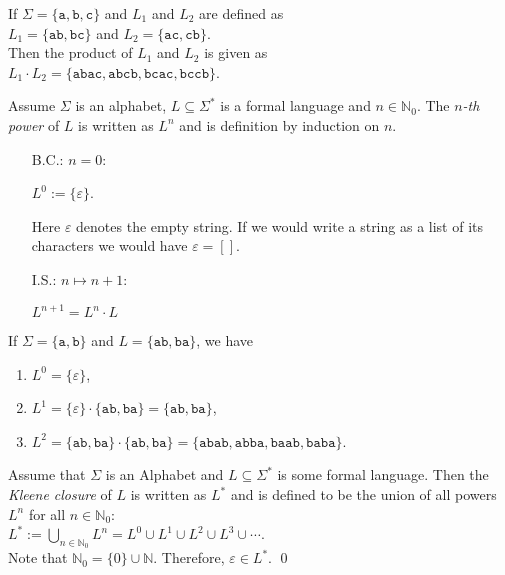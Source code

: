 \exampleEng
If $\Sigma = \{ \texttt{a}, \texttt{b}, \texttt{c} \}$ and $L_1$ and $L_2$ are defined as
\\[0.2cm]
\hspace*{1.3cm}
$L_1 = \{ \texttt{ab}, \texttt{bc} \}$ \quad and \quad
$L_2 = \{ \texttt{ac}, \texttt{cb} \}$. 
\\[0.2cm]
Then the product of $L_1$ and $L_2$ is given as
\\[0.2cm]
\hspace*{1.3cm}
$L_1 \cdot L_2 = \{ \texttt{abac}, \texttt{abcb}, \texttt{bcac}, \texttt{bccb} \}$.  \eox

\begin{Definition} 
Assume $\Sigma$ is an  alphabet, $L \subseteq \Sigma^*$ is a formal language and $n\in\mathbb{N}_0$.
The  \emph{$n$-th power} of $L$ is written as  $L^n$ and is definition by induction on  $n$. 
\begin{enumerate}
\item[B.C.:] $n = 0$: 

      $L^0 := \{ \varepsilon \}$.

      Here $\varepsilon$ denotes the empty string.  If we would write a string as a list of its characters we would have
      $\varepsilon = []$.
\item[I.S.:] $n \mapsto n + 1$:

      $L^{n+1} = L^n \cdot L$  \eox
\end{enumerate}
\end{Definition}

\exampleEng
If $\Sigma = \{ \texttt{a}, \texttt{b} \}$ and $L = \{ \texttt{ab}, \texttt{ba} \}$, we have
\begin{enumerate}
\item $L^0 = \{ \varepsilon \}$,
\item $L^1 = \{ \varepsilon \} \cdot \{ \texttt{ab}, \texttt{ba} \} = \{ \texttt{ab}, \texttt{ba} \}$,
\item $L^2 = \{ \texttt{ab}, \texttt{ba} \} \cdot \{ \texttt{ab}, \texttt{ba} \} = 
             \{ \texttt{abab}, \texttt{abba}, \texttt{baab}, \texttt{baba} \}$.  \eox
\end{enumerate}

\begin{Definition}
  Assume that $\Sigma$ is an Alphabet and $L \subseteq \Sigma^*$ is some formal language. Then the
  \emph{Kleene closure} of $L$ is written as $L^*$ and is defined to be the union of all powers
  $L^n$ for all $n \in \mathbb{N}_0$: 
  \\[0.2cm]
  \hspace*{1.3cm}
  $L^* := \bigcup\limits_{n \in \mathbb{N}_0} L^n = L^0 \cup L^1 \cup L^2 \cup L^3 \cup \cdots$.
  \\[0.2cm]
  Note that $\mathbb{N}_0 = \{0\} \cup \mathbb{N}$. Therefore, $\varepsilon \in L^*$.
  \qed  
\end{Definition}

